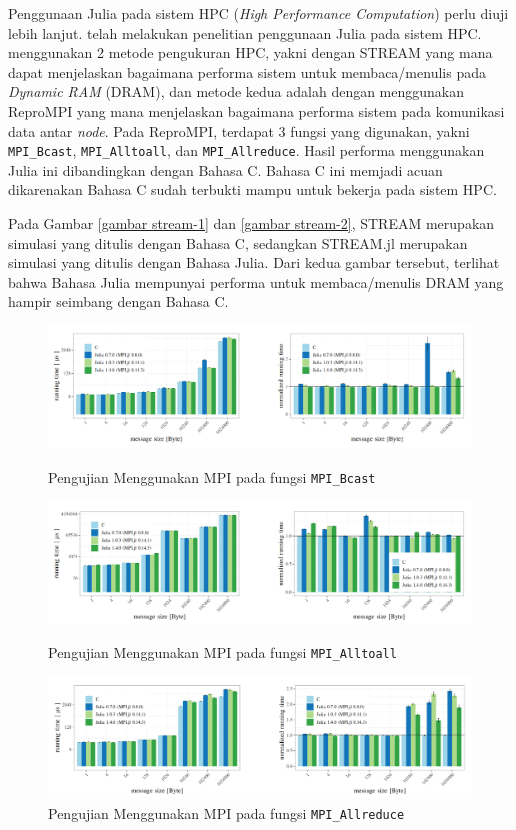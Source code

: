 Penggunaan Julia pada sistem HPC (\emph{High Performance Computation}) perlu diuji
lebih lanjut. \cite{hunoldBenchmarkingJuliaCommunication2020} telah melakukan
penelitian penggunaan Julia pada sistem HPC. \cite{hunoldBenchmarkingJuliaCommunication2020}
menggunakan 2 metode pengukuran HPC, yakni dengan STREAM yang mana dapat
menjelaskan bagaimana performa sistem untuk membaca/menulis pada \emph{Dynamic
RAM} (DRAM), dan metode kedua adalah dengan menggunakan ReproMPI yang mana
menjelaskan bagaimana performa sistem pada komunikasi data antar \emph{node}.
Pada ReproMPI, terdapat 3 fungsi yang digunakan, yakni \texttt{MPI\_Bcast},
\texttt{MPI\_Alltoall}, dan \texttt{MPI\_Allreduce}. Hasil performa menggunakan
Julia ini dibandingkan dengan Bahasa C. Bahasa C ini memjadi acuan dikarenakan Bahasa
C sudah terbukti mampu untuk bekerja pada sistem HPC.

Pada Gambar \ref{gambar stream-1} dan \ref{gambar stream-2}, STREAM merupakan
simulasi yang ditulis dengan Bahasa C, sedangkan STREAM.jl merupakan simulasi yang
ditulis dengan Bahasa Julia. Dari kedua gambar tersebut, terlihat bahwa Bahasa Julia
mempunyai performa untuk membaca/menulis DRAM yang hampir seimbang dengan Bahasa
C.

\begin{figure}[H]
  \centering
  \includegraphics[width=14cm]{images/mpi-1.png}
  \caption{Pengujian Menggunakan MPI pada fungsi \texttt{MPI\_Bcast}}
  \label{gambar mpi-1 bcast}

  \includegraphics[width=14cm]{images/mpi-2.png}
  \caption{Pengujian Menggunakan MPI pada fungsi \texttt{MPI\_Alltoall}}
  \label{gambar mpi-2 alltoall}

  \includegraphics[width=14cm]{images/mpi-3.png}
  \caption{Pengujian Menggunakan MPI pada fungsi \texttt{MPI\_Allreduce}}
  \label{gambar mpi-3 allreduce}
\end{figure}

